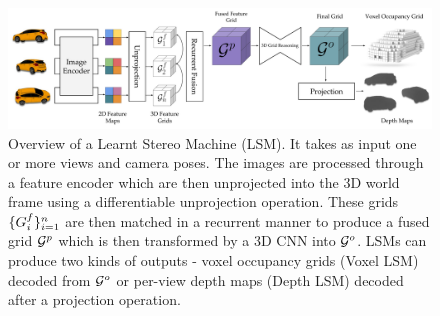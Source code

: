 \begin{figure}
\includegraphics[width=\linewidth]{figures/overview.pdf}
\caption{Overview of a Learnt Stereo Machine (LSM). It takes as input one or more views and camera poses. The images are processed through a feature encoder which are then unprojected into the 3D world frame using a differentiable unprojection operation. These grids $\mathcal{\{}{G}^f_i\}_{i=1}^n$ are then matched in a recurrent manner to produce a fused grid $\mathcal{G}^p$ which is then transformed by a 3D CNN into $\mathcal{G}^o$. LSMs can produce two kinds of outputs - voxel occupancy grids (Voxel LSM) decoded from $\mathcal{G}^o$ or per-view depth maps (Depth LSM) decoded after a projection operation.} 
\end{figure}